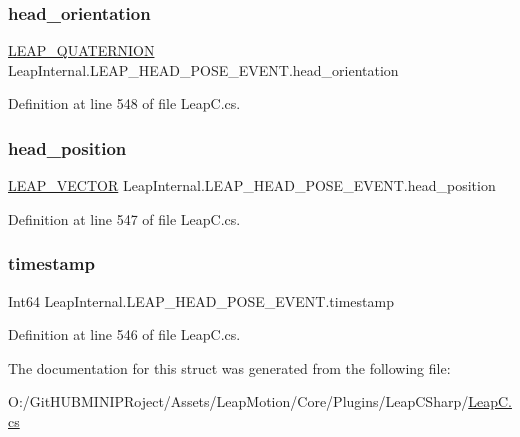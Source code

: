 \subsubsection{\texorpdfstring{head\_orientation}{head\_orientation}}
{\footnotesize\ttfamily \mbox{\hyperlink{struct_leap_internal_1_1_l_e_a_p___q_u_a_t_e_r_n_i_o_n}{L\+E\+A\+P\+\_\+\+Q\+U\+A\+T\+E\+R\+N\+I\+ON}} Leap\+Internal.\+L\+E\+A\+P\+\_\+\+H\+E\+A\+D\+\_\+\+P\+O\+S\+E\+\_\+\+E\+V\+E\+N\+T.\+head\+\_\+orientation}



Definition at line 548 of file Leap\+C.\+cs.

\mbox{\label{struct_leap_internal_1_1_l_e_a_p___h_e_a_d___p_o_s_e___e_v_e_n_t_a5390f8a74376462a0299ac6e61da7ed5}} 
\subsubsection{\texorpdfstring{head\_position}{head\_position}}
{\footnotesize\ttfamily \mbox{\hyperlink{struct_leap_internal_1_1_l_e_a_p___v_e_c_t_o_r}{L\+E\+A\+P\+\_\+\+V\+E\+C\+T\+OR}} Leap\+Internal.\+L\+E\+A\+P\+\_\+\+H\+E\+A\+D\+\_\+\+P\+O\+S\+E\+\_\+\+E\+V\+E\+N\+T.\+head\+\_\+position}



Definition at line 547 of file Leap\+C.\+cs.

\mbox{\label{struct_leap_internal_1_1_l_e_a_p___h_e_a_d___p_o_s_e___e_v_e_n_t_a264e542aa1ff04b5c76cffcad9adc8d2}} 
\subsubsection{\texorpdfstring{timestamp}{timestamp}}
{\footnotesize\ttfamily Int64 Leap\+Internal.\+L\+E\+A\+P\+\_\+\+H\+E\+A\+D\+\_\+\+P\+O\+S\+E\+\_\+\+E\+V\+E\+N\+T.\+timestamp}



Definition at line 546 of file Leap\+C.\+cs.



The documentation for this struct was generated from the following file\+:\begin{DoxyCompactItemize}
\item 
O\+:/\+Git\+H\+U\+B\+M\+I\+N\+I\+P\+Roject/\+Assets/\+Leap\+Motion/\+Core/\+Plugins/\+Leap\+C\+Sharp/\mbox{\hyperlink{_leap_c_8cs}{Leap\+C.\+cs}}\end{DoxyCompactItemize}
